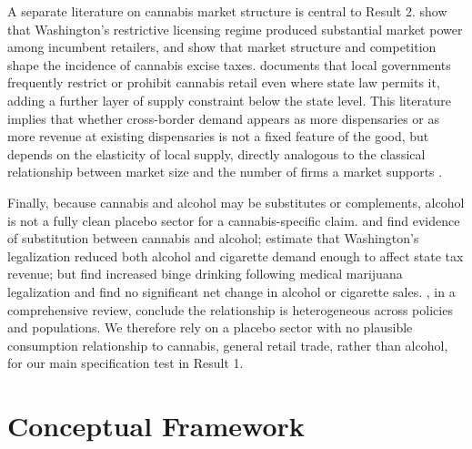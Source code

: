 \documentclass[12pt]{article}
\begin{document}
A separate literature on cannabis market structure is central to Result 2. \citet{HollenbeckUetake2021} show
that Washington's restrictive licensing regime produced substantial market power among incumbent retailers,
and \citet{MacePatelSeegert2020} show that market structure and competition shape the incidence of cannabis
excise taxes. \citet{Yaskewich2022} documents that local governments frequently restrict or prohibit cannabis
retail even where state law permits it, adding a further layer of supply constraint below the state level.
This literature implies that whether cross-border demand appears as more dispensaries or as more revenue at
existing dispensaries is not a fixed feature of the good, but depends on the elasticity of local supply,
directly analogous to the classical relationship between market size and the number of firms a market
supports \citep{BresnahanReiss1991}.

Finally, because cannabis and alcohol may be substitutes or complements, alcohol is not a fully clean
placebo sector for a cannabis-specific claim. \citet{BaggioChongKwon2020} and \citet{AndersonHansenRees2013}
find evidence of substitution between cannabis and alcohol; \citet{MillerSeo2021} estimate that Washington's
legalization reduced both alcohol and cigarette demand enough to affect state tax revenue; but
\citet{WenHockenberryCummings2015} find increased binge drinking following medical marijuana legalization
and \citet{Veligati2020} find no significant net change in alcohol or cigarette sales. \citet{AndersonRees2023},
in a comprehensive review, conclude the relationship is heterogeneous across policies and populations. We
therefore rely on a placebo sector with no plausible consumption relationship to cannabis, general retail
trade, rather than alcohol, for our main specification test in Result 1.

\section{Conceptual Framework}
\end{document}
